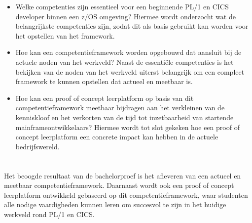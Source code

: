 \begin{itemize}
    \item Welke competenties zijn essentieel voor een beginnende PL/1 en CICS developer binnen een z/OS omgeving? 
    Hiermee wordt onderzocht wat de belangrijkste competenties zijn, zodat dit als basis gebruikt kan worden voor het opstellen van het framework.

    \item Hoe kan een competentieframework worden opgebouwd dat aansluit bij de actuele noden van het werkveld?
    Naast de essentiële competenties is het bekijken van de noden van het werkveld uiterst belangrijk om een compleet framework te kunnen opstellen dat actueel en meetbaar is.

    \item Hoe kan een proof of concept leerplatform op basis van dit competentieframework meetbaar bijdragen aan het verkleinen van de kenniskloof en het verkorten van de tijd tot inzetbaarheid van startende mainframeontwikkelaars?
    Hiermee wordt tot slot gekeken hoe een proof of concept leerplatform een concrete impact kan hebben in de actuele bedrijfswereld.
\end{itemize}



\section{}%
\label{sec:onderzoeksdoelstelling}


Het beoogde resultaat van de bachelorproef is het afleveren van een actueel en meetbaar competentieframework.
Daarnaast wordt ook een proof of concept leerplatform ontwikkeld gebaseerd op dit competentieframework, waar studenten alle nodige vaardigheden kunnen leren om succesvol te zijn in het huidige werkveld rond PL/1 en CICS.

